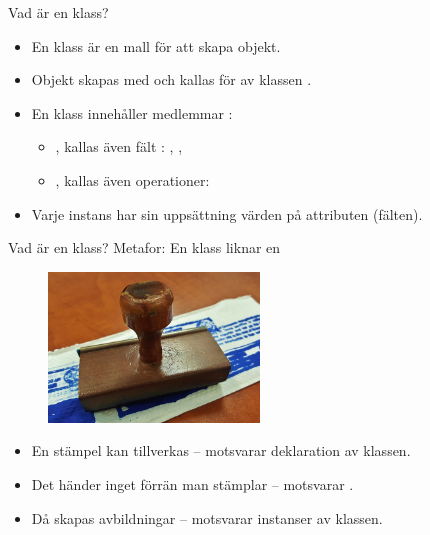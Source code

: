 


\begin{Slide}{Vad är en klass?}
\begin{itemize} 
\item En klass är en mall för att skapa objekt. 
\item Objekt skapas med  och kallas för   av klassen .
\item En klass innehåller medlemmar : 
  \begin{itemize} 
  \item {}, kallas även fält : , ,  
  \item {}, kallas även operationer: 
  \end{itemize}
\item Varje instans har sin uppsättning värden på attributen (fälten).
\end{itemize}

\end{Slide}


\ifkompendium\else


\begin{Slide}{Vad är en klass?}\SlideFontSmall
Metafor: En klass liknar en 
\begin{figure}
\centering
\includegraphics[width=0.5\textwidth]{../img/stamp}
\end{figure}
\begin{itemize}
\item En stämpel kan tillverkas -- motsvarar deklaration av klassen. 
 \item Det händer inget förrän man stämplar -- motsvarar .
\item Då skapas avbildningar -- motsvarar instanser av klassen.


\end{itemize}
\end{Slide}


